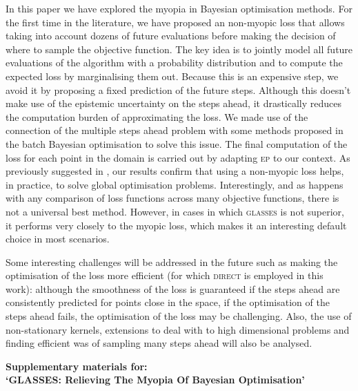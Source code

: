 \documentclass[twoside]{article}
\newcommand{\acr}[1]{\textsc{#1}\xspace}
\newcommand{\us}{\acr{glasses}}
\newcommand{\direct}{\acr{direct}}
\newcommand{\ep}{\acr{ep}}
\begin{document}
In this paper we have explored the myopia in Bayesian optimisation methods. For the first time in the literature, we have proposed an non-myopic loss that allows taking into account dozens of future evaluations before making the decision of where to sample the objective function. The key idea is to jointly model all future evaluations of the algorithm with a probability distribution and to compute the expected loss by marginalising them out. Because this is an expensive step, we avoid it by proposing a fixed prediction of the future steps. Although this doesn't make use of the epistemic uncertainty on the steps ahead, it drastically reduces the computation burden of approximating the loss. We made use of the connection of the multiple steps ahead problem with some methods proposed in the batch Bayesian optimisation to solve this issue. The final computation of the loss for each point in the domain is carried out by adapting \ep to our context. As previously suggested in \cite{osborne_gaussian_2009}, our results confirm that using a non-myopic loss helps, in practice, to solve global optimisation problems. Interestingly, and as happens with any comparison of loss functions across many objective functions, there is not a universal best method. However, in cases in which \us is not superior, it performs very closely to the myopic loss, which makes it an interesting default choice in most scenarios. 

Some interesting challenges will be addressed in the future such as making the optimisation of the loss more efficient (for which \direct is employed in this work): although the smoothness of the loss is guaranteed if the steps ahead are consistently predicted for points close in the space, if the optimisation of the steps ahead fails,  the optimisation of the loss may be challenging.  Also, the use of non-stationary kernels, extensions to deal with to high dimensional problems and finding efficient was of sampling many steps ahead will also be analysed.
  




\newpage
\clearpage
\setcounter{section}{0}
\setcounter{equation}{0}
\renewcommand{\thesection}{S\arabic{section}}
\renewcommand{\theequation}{S.\arabic{equation}}
\onecolumn
\begin{center}
{\Large  \textbf{Supplementary materials for:\\
`GLASSES: Relieving The Myopia Of Bayesian Optimisation'}}
\end{center}
\end{document}

